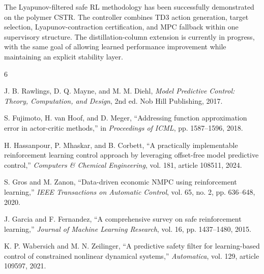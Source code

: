 \documentclass[10pt]{article}
\begin{document}
The Lyapunov-filtered safe RL methodology has been successfully demonstrated on the polymer CSTR. The controller combines TD3 action generation, target selection, Lyapunov-contraction certification, and MPC fallback within one supervisory structure. The distillation-column extension is currently in progress, with the same goal of allowing learned performance improvement while maintaining an explicit stability layer.

\begin{thebibliography}{6}

J. B. Rawlings, D. Q. Mayne, and M. M. Diehl, \emph{Model Predictive Control: Theory, Computation, and Design}, 2nd ed. Nob Hill Publishing, 2017.

S. Fujimoto, H. van Hoof, and D. Meger, ``Addressing function approximation error in actor-critic methods,'' in \emph{Proceedings of ICML}, pp. 1587--1596, 2018.

H. Hassanpour, P. Mhaskar, and B. Corbett, ``A practically implementable reinforcement learning control approach by leveraging offset-free model predictive control,'' \emph{Computers \& Chemical Engineering}, vol. 181, article 108511, 2024.

S. Gros and M. Zanon, ``Data-driven economic NMPC using reinforcement learning,'' \emph{IEEE Transactions on Automatic Control}, vol. 65, no. 2, pp. 636--648, 2020.

J. Garcia and F. Fernandez, ``A comprehensive survey on safe reinforcement learning,'' \emph{Journal of Machine Learning Research}, vol. 16, pp. 1437--1480, 2015.

K. P. Wabersich and M. N. Zeilinger, ``A predictive safety filter for learning-based control of constrained nonlinear dynamical systems,'' \emph{Automatica}, vol. 129, article 109597, 2021.

\end{thebibliography}
\end{document}

